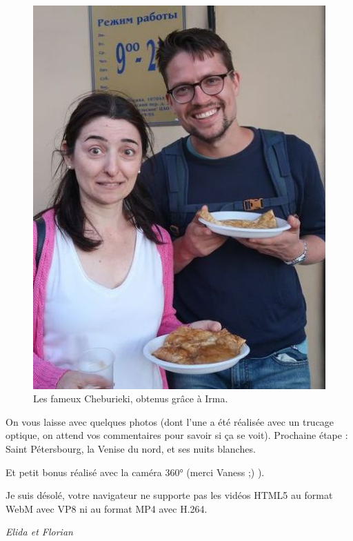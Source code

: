 \begin{figure}
\centering
\includegraphics{images/20180603_cheburieki.JPG}
\caption{Les fameux Cheburieki, obtenus grâce à Irma.}
\end{figure}

On vous laisse avec quelques photos (dont l'une a été réalisée avec un
trucage optique, on attend vos commentaires pour savoir si ça se voit).
Prochaine étape : Saint Pétersbourg, la Venise du nord, et ses nuits
blanches.

Et petit bonus réalisé avec la caméra 360° (merci Vaness ;) ).

Je suis désolé, votre navigateur ne supporte pas les vidéos HTML5 au
format WebM avec VP8 ni au format MP4 avec H.264.

\emph{Elida et Florian}
